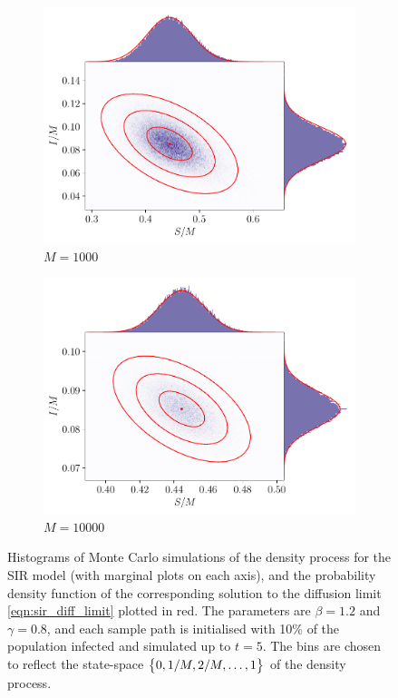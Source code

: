 \begin{figure}
\begin{subfigure}{0.49\textwidth}
		\includegraphics[width=\textwidth]{chp07_outlook/figures/sir/sir_pairwise_1000}
		\caption{\(M = 1000\)}
		\label{fig:sir_gauss_rels_3}
	\end{subfigure}\begin{subfigure}{0.49\textwidth}
		\includegraphics[width=\textwidth]{chp07_outlook/figures/sir/sir_pairwise_10000}
		\caption{\(M = 10000\)}
		\label{fig:sir_gauss_rels_4}
	\end{subfigure}
	\caption{Histograms of Monte Carlo simulations of the density process for the SIR model (with marginal plots on each axis), and the probability density function of the corresponding solution to the diffusion limit \cref{eqn:sir_diff_limit} plotted in red.
		The parameters are \(\beta = 1.2\) and \(\gamma = 0.8\), and each sample path is initialised with 10\% of the population infected and simulated up to \(t = 5\).
		The bins are chosen to reflect the state-space \(\set{0, 1/M, 2/M, \dotsc, 1}\) of the density process.}
	\label{fig:sir_gauss_rels}
\end{figure}

